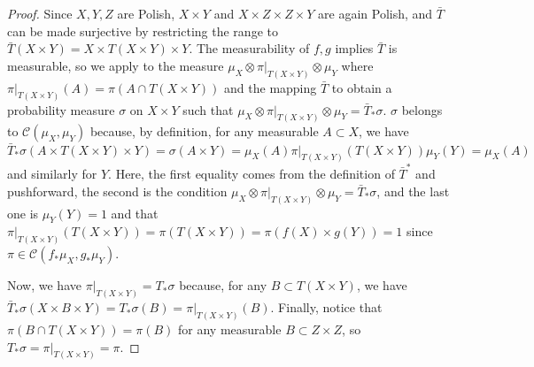 \documentclass[twoside,11pt]{article}
\theoremstyle{definition}
\begin{document}
\begin{proof}
    
    Since $X,Y,Z$ are Polish, $X\times Y$ and $X\times Z\times Z\times Y$ are again Polish, and $\bar{T}$ can be made surjective by restricting the range to $\bar{T}(X\times Y)=X\times T(X\times Y)\times Y$. The measurability of $f,g$ implies $\bar{T}$ is measurable, so we apply  to the measure $\mu_X\otimes \pi|_{T(X\times Y)}\otimes \mu_Y$ where $\pi|_{T(X\times Y)}(A)=\pi(A\cap T(X\times Y))$ and the mapping $\bar{T}$ to obtain a probability measure $\sigma$ on $X\times Y$ such that $\mu_X\otimes \pi|_{T(X\times Y)}\otimes \mu_Y=\bar{T}_* \sigma$. $\sigma$ belongs to $\mathcal{C}(\mu_X,\mu_Y)$ because, by definition, for any measurable $A\subset X$, we have 
    \begin{equation}
    \bar{T}_*\sigma(A\times T(X\times Y)\times Y)=\sigma(A\times Y) = \mu_X(A)\pi|_{T(X\times Y)}(T(X\times Y))\mu_Y(Y)=\mu_X(A)
    \end{equation}
     and similarly for $Y$. Here, the first equality comes from the definition of $\bar{T}^*$ and pushforward, the second is the condition $\mu_X\otimes \pi|_{T(X\times Y)}\otimes \mu_Y=\bar{T}_* \sigma$, and the last one is $\mu_{Y}(Y)=1$ and that $\pi|_{T(X\times Y)}(T(X\times Y)) = \pi(T(X\times Y))=\pi(f(X)\times g(Y))=1$ since $\pi \in \mathcal{C}(f_*\mu_X, g_*\mu_Y)$. 
     
     Now, we have $\pi|_{T(X\times Y)}=T_* \sigma$ because, for any $B\subset T(X\times Y)$, we have $\bar{T}_*\sigma(X\times B\times Y) = T_* \sigma(B) = \pi|_{T(X\times Y)}(B)$. Finally, notice that $\pi(B\cap T(X\times Y)) = \pi(B)$ for any measurable $B\subset Z\times Z$, so $T_*\sigma = \pi|_{T(X\times Y)} = \pi$.
\end{proof}



\vskip 0.2in

\end{document}
